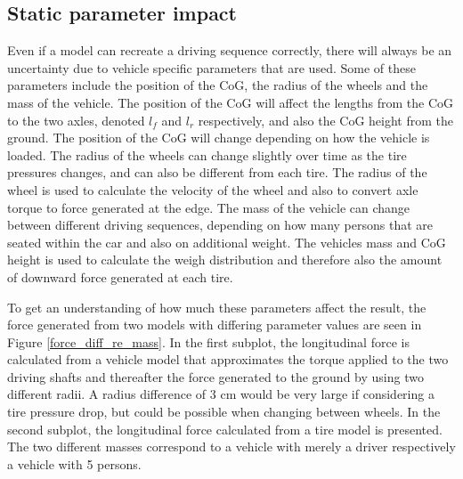 \subsection{Static parameter impact} 
Even if a model can recreate a driving sequence correctly, there will always be an uncertainty due to vehicle specific parameters that are used. Some of these parameters include the position of the CoG, the radius of the wheels and the mass of the vehicle. The position of the CoG will affect the lengths from the CoG to the two axles, denoted $ l_{f} $ and $ l_{r} $ respectively, and also the CoG height from the ground. The position of the CoG will change depending on how the vehicle is loaded. The radius of the wheels can change slightly over time as the tire pressures changes, and can also be different from each tire. The radius of the wheel is used to calculate the velocity of the wheel and also to convert axle torque to force generated at the edge. The mass of the vehicle can change between different driving sequences, depending on how many persons that are seated within the car and also on additional weight. The vehicles mass and CoG height is used to calculate the weigh distribution and therefore also the amount of downward force generated at each tire. 

To get an understanding of how much these parameters affect the result, the force generated from two models with differing parameter values are seen in Figure \ref{force_diff_re_mass}. In the first subplot, the longitudinal force is calculated from a vehicle model that approximates the torque applied to the two driving shafts and thereafter the force generated to the ground by using two different radii. A radius difference of $ 3 $ cm would be very large if considering a tire pressure drop, but could be possible when changing between wheels. In the second subplot, the longitudinal force calculated from a tire model is presented. The two different masses correspond to a vehicle with merely a driver respectively a vehicle with 5 persons. 

